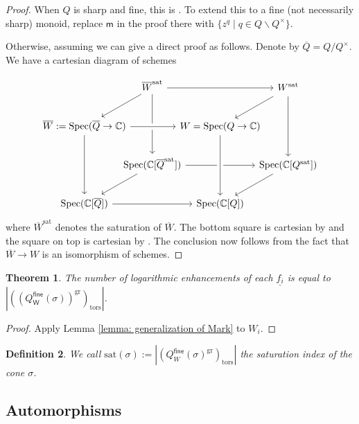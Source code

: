 \documentclass{article}
\def\C{\mathbb{C}}
\newtheorem{definition}{Definition}[section]
\newtheorem{theorem}[definition]{Theorem}
\newcommand{\gr}{\mathrm{gr}}
\newcommand{\sat}{\mathrm{sat}}
\newcommand{\tors}{\mathrm{tors}}
\newcommand{\fine}{\mathsf{fine}}
\newcommand{\W}{\mathsf{W}}
\begin{document}
\begin{proof}
When \( Q \) is sharp and fine, this is \cite[Lemma~3.1]{Gross23}. 
To extend this to a fine (not necessarily sharp) monoid, replace \( \mathsf{m} \) in the proof there with 
$
\{ z^q \mid q \in Q \smallsetminus Q^{\times} \}.
$

Otherwise, assuming \cite[Lemma~3.1]{Gross23} we can give a direct proof as follows. Denote by $\overline{Q}= Q/ Q^{\times}$. We have a cartesian diagram of schemes

\[\begin{tikzcd}[row sep={40,between origins}, column sep={70,between origins}]
      &\overline{W}^{\sat}  \ar{rr}\ar{dd}\ar{dl} & & W^{\sat}\vphantom{\times_{S_1}} \ar{dd}\ar{dl} \\
    \overline{W}:=\mathrm{Spec}(\overline{Q} \to \C) \ar[crossing over]{rr} \ar{dd} & & W=\mathrm{Spec}(Q \to \C) \\
      & \mathrm{Spec}(\C[\overline{Q}^{\sat}]) \ar{rr} \ar{dl} & & \mathrm{Spec}(\C[Q^{\sat}]) \vphantom{\times_{S_1}} \ar{dl} \\
    \mathrm{Spec}(\C[\overline{Q}]) \ar{rr} &&  \mathrm{Spec}(\C[Q])\ar[from=uu,crossing over]
\end{tikzcd}\]
where $\overline{W}^{\sat}$ denotes the saturation of $\overline{W}$. The bottom square is cartesian by \cite[Proposition 1.3.5 (5)]{Ogus} and the square on top is cartesian by \cite[Lemma~3.1]{Gross23}. The conclusion now follows from the fact that $\overline{W} \to W$ is an isomorphism of schemes.
\end{proof}


\begin{theorem}\label{thm: number of logarithmic enhancements}
    The number of logarithmic enhancements of each $\underline{f_{i}}$ is equal to $|((Q_\W^{\mathsf{fine}}(\sigma))^{\gr})_{\tors}|$.
\end{theorem}

\begin{proof}
    Apply Lemma \ref{lemma: generalization of Mark} to $W_i$.
\end{proof}




\begin{definition} \label{def: sat}
    We call $\sat(\sigma):= |(Q^{\fine}_W(\sigma)^{\gr})_{\tors}|$
    the saturation index of the cone $\sigma$. 
\end{definition}

\subsection{Automorphisms}\label{sec: automorphisms}
\end{document}
